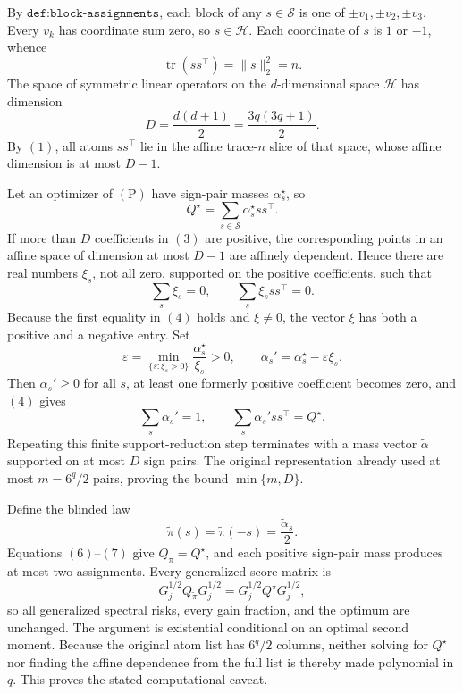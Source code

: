 By \(\texttt{def:block-assignments}\), each block of any \(s\in\mathscr S\) is one of \(\pm v_1,\pm v_2,\pm v_3\). Every \(v_k\) has coordinate sum zero, so \(s\in\mathcal H\). Each coordinate of \(s\) is \(1\) or \(-1\), whence
\[
\operatorname{tr}(ss^\top)=\lVert s\rVert_2^2=n.
\tag{1}
\]
The space of symmetric linear operators on the \(d\)-dimensional space \(\mathcal H\) has dimension
\[
D=\frac{d(d+1)}2=\frac{3q(3q+1)}2.
\tag{2}
\]
By \((1)\), all atoms \(ss^\top\) lie in the affine trace-\(n\) slice of that space, whose affine dimension is at most \(D-1\).

Let an optimizer of \((\mathrm P)\) have sign-pair masses \(\alpha_s^\star\), so
\[
Q^\star=\sum_{s\in\mathscr S}\alpha_s^\star ss^\top.
\tag{3}
\]
If more than \(D\) coefficients in \((3)\) are positive, the corresponding points in an affine space of dimension at most \(D-1\) are affinely dependent. Hence there are real numbers \(\xi_s\), not all zero, supported on the positive coefficients, such that
\[
\sum_s\xi_s=0,
\qquad
\sum_s\xi_sss^\top=0.
\tag{4}
\]
Because the first equality in \((4)\) holds and \(\xi\ne0\), the vector \(\xi\) has both a positive and a negative entry. Set
\[
\varepsilon=
\min_{\{s:\xi_s>0\}}\frac{\alpha_s^\star}{\xi_s}>0,
\qquad
\alpha_s'=\alpha_s^\star-\varepsilon\xi_s.
\tag{5}
\]
Then \(\alpha_s'\ge0\) for all \(s\), at least one formerly positive coefficient becomes zero, and \((4)\) gives
\[
\sum_s\alpha_s'=1,
\qquad
\sum_s\alpha_s'ss^\top=Q^\star.
\tag{6}
\]
Repeating this finite support-reduction step terminates with a mass vector \(\widetilde\alpha\) supported on at most \(D\) sign pairs. The original representation already used at most \(m=6^q/2\) pairs, proving the bound \(\min\{m,D\}\).

Define the blinded law
\[
\widetilde\pi(s)=\widetilde\pi(-s)=\frac{\widetilde\alpha_s}{2}.
\tag{7}
\]
Equations \((6)\)--\((7)\) give \(Q_{\widetilde\pi}=Q^\star\), and each positive sign-pair mass produces at most two assignments. Every generalized score matrix is
\[
G_j^{1/2}Q_{\widetilde\pi}G_j^{1/2}
=G_j^{1/2}Q^\star G_j^{1/2},
\]
so all generalized spectral risks, every gain fraction, and the optimum are unchanged. The argument is existential conditional on an optimal second moment. Because the original atom list has \(6^q/2\) columns, neither solving for \(Q^\star\) nor finding the affine dependence from the full list is thereby made polynomial in \(q\). This proves the stated computational caveat.